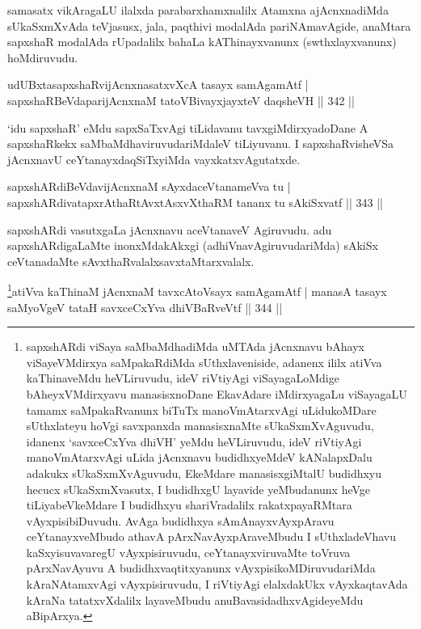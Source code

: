 \begin{artha}
samasatx vikAragaLU ilalxda parabarxhamxnalilx Atamxna ajAcnxnadiMda sUkaSxmXvAda teVjasusx, jala, paqthivi modalAda pariNAmavAgide, anaMtara sapxshaR modalAda rUpadalilx bahaLa kAThinayxvanunx (swthxlayxvanunx) hoMdiruvudu.
\end{artha}

\begin{shl}
udUBxtasapxshaRvijAcnxnasatxvXcA tasayx samAgamAtf |
sapxshaRBeVdaparijAcnxnaM tatoV\s BivayxjayxteV daqsheVH \hfill || 342 ||
\end{shl}

\begin{artha}
`idu sapxshaR' eMdu sapxSaTxvAgi tiLidavanu tavxgiMdirxyadoDane A sapxshaRkekx saMbaMdhaviruvudariMdaleV tiLiyuvanu. I sapxshaRvisheVSa jAcnxnavU ceYtanayxdaqSiTxyiMda vayxkatxvAgutatxde.
\end{artha}

\begin{shl}
sapxshARdiBeVdavijAcnxnaM sAyxdaceVtanameVva tu |
sapxshARdivatapxrAthaRtAvxtAsxvXthaRM tananx tu sAkiSxvatf \hfill || 343 ||
\end{shl}

\begin{artha}
sapxshARdi vasutxgaLa jAcnxnavu aceVtanaveV Agiruvudu. adu sapxshARdigaLaMte inonxMdakAkxgi (adhiVnavAgiruvudariMda) sAkiSx ceVtanadaMte sAvxthaRvalalx\break savxtaMtarxvalalx.
\end{artha}

\begin{shl}
\footnote{sapxshARdi viSaya saMbaMdhadiMda uMTAda jAcnxnavu bAhayx viSayeVMdirxya saMpakaRdiMda sUthxlaveniside, adanenx ililx atiVva kaThinaveMdu heVLiruvudu, ideV riVtiyAgi viSayagaLoMdige bAheyxVMdirxyavu manasisxnoDane EkavAdare iMdirxyagaLu viSayagaLU tamamx saMpakaRvanunx biTuTx manoVmAtarxvAgi uLidukoMDare sUthxlateyu hoVgi savxpanxda manasisxnaMte sUkaSxmXvAguvudu, idanenx `savxceCxYva dhiVH' yeMdu heVLiruvudu, ideV riVtiyAgi manoVmAtarxvAgi uLida jAcnxnavu budidhxyeMdeV kANalapxDalu adakukx sUkaSxmXvAguvudu, EkeMdare manasisxgiMtalU budidhxyu hecucx sUkaSxmXvasutx, I budidhxgU layavide yeMbudanunx heVge tiLiyabeVkeMdare \mdash I budidhxyu shariVradalilx rakatxpayaRMtara vAyxpisibiDuvudu. AvAga budidhxya sAmAnayxvAyxpAravu ceYtanayxveMbudo athavA pArxNavAyxpAraveMbudu I sUthxladeVhavu kaSxyisuvavaregU vAyxpisiruvudu, ceYtanayxviruvaMte toVruva pArxNavAyuvu A budidhxvaqtitxyanunx vAyxpisikoMDiruvudariMda kAraNAtamxvAgi vAyxpisiruvudu, I riVtiyAgi elalxdakUkx vAyxkaqtavAda kAraNa tatatxvXdalilx layaveMbudu anuBavasidadhxvAgideyeMdu aBipArxya.}atiVva kaThinaM jAcnxnaM tavxcAtoV\s sayx samAgamAtf |
manasA tasayx saMyoVgeV tataH savxceCxYva dhiVBaRveVtf \hfill || 344 ||
\end{shl}



